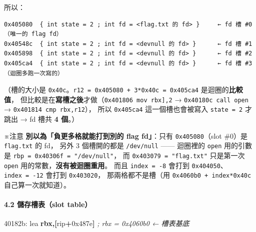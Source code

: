 \documentclass[10pt,a4paper]{article}
\newenvironment{Shaded}{\begin{snugshade}}{\end{snugshade}}
\newcommand{\BaseNTok}[1]{\textcolor[rgb]{0.00,0.00,0.81}{#1}}
\newcommand{\BuiltInTok}[1]{#1}
\newcommand{\CommentTok}[1]{\textcolor[rgb]{0.56,0.35,0.01}{\textit{#1}}}
\newcommand{\KeywordTok}[1]{\textcolor[rgb]{0.13,0.29,0.53}{\textbf{#1}}}
\newcommand{\NormalTok}[1]{#1}
\newcommand{\OperatorTok}[1]{\textcolor[rgb]{0.81,0.36,0.00}{\textbf{#1}}}
\renewenvironment{Shaded}{%
  \def\FrameCommand{\fboxsep=3.2pt\colorbox{shadecolor}}%
  \MakeFramed{\advance\hsize-\width\FrameRestore\small}%
}{%
  \endMakeFramed
}
\renewenvironment{quote}{%
  \begin{mdframed}[linewidth=0pt,innerleftmargin=0pt,innerrightmargin=0pt,
    innerbottommargin=0pt,innertopmargin=0pt,skipabove=0.55em,skipbelow=0.55em,
    leftmargin=0.9em,rightmargin=0.4em,startcode={\color{quotebar}\vrule width 2.6pt},%
    endcode={}]%
  \itshape\color{black}%
}{%
  \end{mdframed}%
}
\begin{document}
所以：

\begin{Verbatim}[breaklines=true,breakanywhere=true,breakautoindent=false,fontsize=\fontsize{7.0}{9.5}\selectfont]
0x405080  { int state = 2 ; int fd = <flag.txt 的 fd> }     ← fd 槽 #0（唯一的 flag fd）
0x40548c  { int state = 2 ; int fd = <devnull 的 fd> }      ← fd 槽 #1
0x405898  { int state = 2 ; int fd = <devnull 的 fd> }      ← fd 槽 #2
0x405ca4  { int state = 2 ; int fd = <devnull 的 fd> }      ← fd 槽 #3（迴圈多跑一次寫的）
\end{Verbatim}

（槽的大小是
\texttt{0x40c}。\texttt{r12\ \allowbreak{}=\ \allowbreak{}0x405080\ \allowbreak{}+\ \allowbreak{}3*0x40c\ \allowbreak{}=\ \allowbreak{}0x405ca4}
是迴圈的\textbf{比較值}，
但比較是在\textbf{寫槽之後}才做（\texttt{0x401806\ \allowbreak{}mov\ \allowbreak{}{[}rbx{]},\allowbreak{}2} →
\texttt{0x40180c\ \allowbreak{}call\ \allowbreak{}open} → \texttt{0x401814\ \allowbreak{}cmp\ \allowbreak{}rbx,\allowbreak{}r12}）， 所以
\texttt{0x405ca4} 這一個槽也會被寫入 \texttt{state\ \allowbreak{}=\ \allowbreak{}2} 才跳出 → fd
槽共 \textbf{4 個}。）

\begin{quote}
※注意 \textbf{別以為「負更多格就能打到別的 flag fd」}：只有
\texttt{0x405080}（slot \#0）是 \texttt{flag.\allowbreak{}txt} 的 fd， 另外 3
個槽開的都是 \texttt{/\allowbreak{}dev/\allowbreak{}null} ------ 迴圈裡的 \texttt{open} 用的引數是
\texttt{rbp\ \allowbreak{}=\ \allowbreak{}0x40306f\ \allowbreak{}=\ \allowbreak{}"/\allowbreak{}dev/\allowbreak{}null"}， 而
\texttt{0x403079\ \allowbreak{}=\ \allowbreak{}"flag.\allowbreak{}txt"} 只是第一次 \texttt{open}
用的常數，\textbf{沒有被迴圈重用}。 而且 \texttt{index\ \allowbreak{}=\ \allowbreak{}-\allowbreak{}8} 會打到
\texttt{0x404050}、\texttt{index\ \allowbreak{}=\ \allowbreak{}-\allowbreak{}12} 會打到 \texttt{0x403020}，
那兩格都不是槽（用 \texttt{0x4060b0\ \allowbreak{}+\ \allowbreak{}index*0x40c}
自己算一次就知道）。
\end{quote}

\paragraph{4.2 儲存槽表（slot
table）}\label{ux5132ux5b58ux69fdux8868slot-table}

\begin{Shaded}
\begin{Highlighting}[]
\NormalTok{40182b:  }\BuiltInTok{lea}  \KeywordTok{rbx}\OperatorTok{,[}\NormalTok{rip}\OperatorTok{+}\BaseNTok{0x487e}\OperatorTok{]}        \CommentTok{; rbx = 0x4060b0  ← 槽表基底}
\end{Highlighting}
\end{Shaded}
\end{document}
